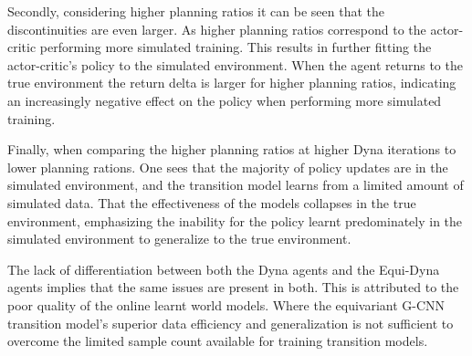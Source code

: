 Secondly, considering higher planning ratios it can be seen that the discontinuities are even larger. As higher planning ratios correspond to the actor-critic performing more simulated training. This results in further fitting the actor-critic's policy to the simulated environment. When the agent returns to the true environment the return delta is larger for higher planning ratios, indicating an increasingly negative effect on the policy when performing more simulated training.

Finally, when comparing the higher planning ratios at higher Dyna iterations to lower planning rations. One sees that the majority of policy updates are in the simulated environment, and the transition model learns from a limited amount of simulated data. That the effectiveness of the models collapses in the true environment, emphasizing the inability for the policy learnt predominately in the simulated environment to generalize to the true environment.



The lack of differentiation between both the Dyna agents and the Equi-Dyna agents implies that the same issues are present in both. This is attributed to the poor quality of the online learnt world models. Where the equivariant G-CNN transition model's superior data efficiency and generalization is not sufficient to overcome the limited sample count available for training transition models.

